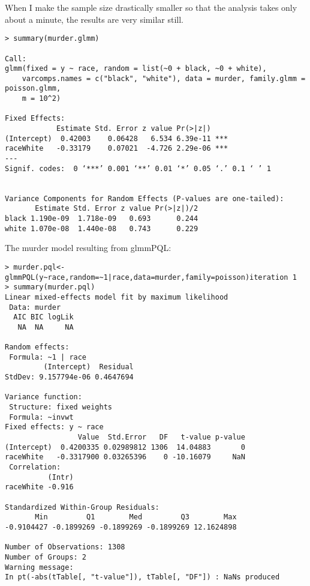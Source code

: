 \documentclass{article}
\begin{document}
When I make the sample size drastically smaller so that the analysis takes only about a minute, the results are very similar still.
\begin{verbatim}
> summary(murder.glmm)

Call:
glmm(fixed = y ~ race, random = list(~0 + black, ~0 + white), 
    varcomps.names = c("black", "white"), data = murder, family.glmm = poisson.glmm, 
    m = 10^2)

Fixed Effects:
            Estimate Std. Error z value Pr(>|z|)    
(Intercept)  0.42003    0.06428   6.534 6.39e-11 ***
raceWhite   -0.33179    0.07021  -4.726 2.29e-06 ***
---
Signif. codes:  0 ‘***’ 0.001 ‘**’ 0.01 ‘*’ 0.05 ‘.’ 0.1 ‘ ’ 1


Variance Components for Random Effects (P-values are one-tailed):
       Estimate Std. Error z value Pr(>|z|)/2
black 1.190e-09  1.718e-09   0.693      0.244
white 1.070e-08  1.440e-08   0.743      0.229

\end{verbatim}

The murder model resulting from glmmPQL:
\begin{verbatim}
> murder.pql<-glmmPQL(y~race,random=~1|race,data=murder,family=poisson)iteration 1
> summary(murder.pql)
Linear mixed-effects model fit by maximum likelihood
 Data: murder 
  AIC BIC logLik
   NA  NA     NA

Random effects:
 Formula: ~1 | race
         (Intercept)  Residual
StdDev: 9.157794e-06 0.4647694

Variance function:
 Structure: fixed weights
 Formula: ~invwt 
Fixed effects: y ~ race 
                 Value  Std.Error   DF   t-value p-value
(Intercept)  0.4200335 0.02989812 1306  14.04883       0
raceWhite   -0.3317900 0.03265396    0 -10.16079     NaN
 Correlation: 
          (Intr)
raceWhite -0.916

Standardized Within-Group Residuals:
       Min         Q1        Med         Q3        Max 
-0.9104427 -0.1899269 -0.1899269 -0.1899269 12.1624898 

Number of Observations: 1308
Number of Groups: 2 
Warning message:
In pt(-abs(tTable[, "t-value"]), tTable[, "DF"]) : NaNs produced

\end{verbatim}
\end{document}
